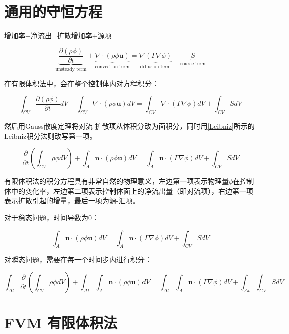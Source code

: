 \section{通用的守恒方程}
增加率+净流出=扩散增加率+源项

\begin{equation}
\underbrace{\frac{\partial (\rho\phi)}{\partial t}}_{\text{unsteady term}} +
\underbrace{\nabla\cdot(\rho\phi\bm{u})}_{\text{convection term}} =
\underbrace{\nabla(\Gamma\nabla\phi)}_{\text{diffusion term}} +
\underbrace{S}_{\text{source term}}
\end{equation}

在有限体积法中，会在整个控制体内对方程积分：

\begin{equation}
\int_{CV}\frac{\partial (\rho\phi)}{\partial t}dV + \int_{CV}\nabla\cdot(\rho\phi\bm{u})dV = \int_{CV}\nabla\cdot(\Gamma\nabla\phi)dV + \int_{CV}SdV
\end{equation}

然后用Gauss散度定理将对流-扩散项从体积分改为面积分，同时用\autoref{Leibniz}所示的Leibniz积分法则改写第一项。

\begin{equation}
\frac{\partial}{\partial t}\left(\int_{CV}\rho\phi dV\right) + \int_{A}\bm{n}\cdot(\rho\phi\bm{u})dV = \int_{A}\bm{n}\cdot(\Gamma\nabla\phi)dV + \int_{CV}SdV
\end{equation}

有限体积法的积分方程具有非常自然的物理意义，左边第一项表示物理量$ \phi $在控制体中的变化率，左边第二项表示控制体面上的净流出量（即对流项），右边第一项表示扩散引起的增量，最后一项为源-汇项。

对于稳态问题，时间导数为0：

\begin{equation}
\int_{A}\bm{n}\cdot(\rho\phi\bm{u})dV = \int_{A}\bm{n}\cdot(\Gamma\nabla\phi)dV + \int_{CV}SdV
\end{equation}

对瞬态问题，需要在每一个时间步内进行积分：

\begin{equation}
\int_{\Delta t}\frac{\partial}{\partial t}\left(\int_{CV}\rho\phi dV\right) + \int_{\Delta t}\int_{A}\bm{n}\cdot(\rho\phi\bm{u})dV = \int_{\Delta t}\int_{A}\bm{n}\cdot(\Gamma\nabla\phi)dV + \int_{\Delta t}\int_{CV}SdV
\end{equation}

\section{FVM 有限体积法}


